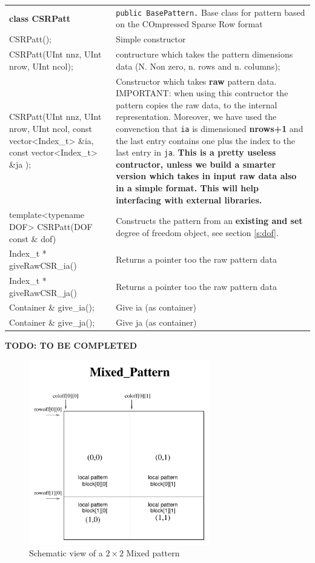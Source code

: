\begin{tabularx}{\textwidth}{>{\ttfamily}lX}
  \textbf{class CSRPatt} & \texttt{public BasePattern.} Base class for
  pattern based on the COmpressed Sparse Row format\\
CSRPatt(); & Simple constructor\\
  CSRPatt(UInt nnz, UInt nrow, UInt ncol); & contructure which
  takes the pattern dimensions data (N. Non zero, n. rows and n. columns);\\
  CSRPatt(UInt nnz, UInt nrow, UInt ncol, const vector<Index\_t>
  \&ia, const vector<Index\_t> \&ja );& Constructor which takes
  \textbf{raw} pattern data. IMPORTANT: when using this contructor the pattern copies
  the raw data, to the internal representation.  Moreover, we have used
  the convenction that \texttt{ia} is dimensioned \textbf{nrows+1} and
  the last entry contains one plus the index to the last entry in
  \texttt{ja}. \textbf{This is a pretty useless contructor, unless we
    build a smarter version which takes in input raw data also in a
    simple format. This will help interfacing with external libraries.}\\
  template<typename DOF> CSRPatt(DOF const  \& dof) & Constructs the
  pattern from an \textbf{existing and set} degree of freedom object,
  see  section \ref{s:dof}.\\
  Index\_t * giveRawCSR\_ia()  & Returns a pointer too the raw pattern data\\
  Index\_t * giveRawCSR\_ja() & Returns a pointer too the raw pattern
  data\\
  Container \& give\_ia();& Give ia (as container)\\
  Container \& give\_ja();& Give ja (as container)\\
\end{tabularx}

\textbf{\Large TODO: TO BE COMPLETED}
\begin{figure}[htb]
  \begin{center}
    \includegraphics[width=0.7\textwidth]{mixed_pattern}
    
  \end{center}
  \caption{Schematic view of a $2\times2$ Mixed pattern}
\end{figure}

